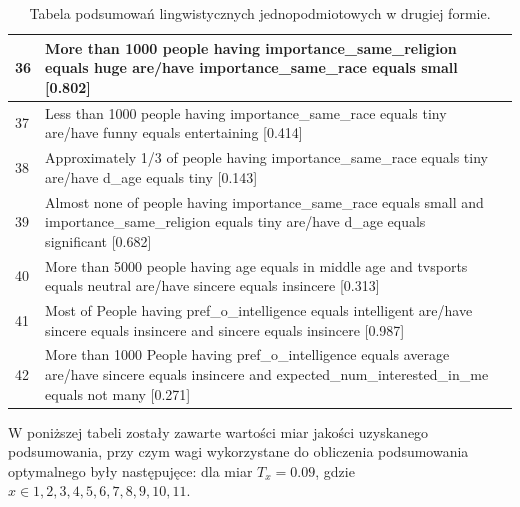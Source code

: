 \documentclass{classrep}
\begin{document}
\begin{center}
\begin{table}[H]
\begin{tabularx}{\textwidth}{lXc}
    36 & More than 1000 people having importance\_same\_religion equals huge are/have importance\_same\_race equals small [0.802]\\ \hline
    37 & Less than 1000 people having importance\_same\_race equals tiny are/have funny equals entertaining [0.414] \\ \hline
    38 & Approximately 1/3 of people having importance\_same\_race equals tiny are/have d\_age equals tiny [0.143] \\ \hline
    39 & Almost none of people having importance\_same\_race equals small and importance\_same\_religion equals tiny are/have d\_age equals significant [0.682] \\ \hline
    40 & More than 5000 people having age equals in middle age and tvsports equals neutral are/have sincere equals insincere [0.313] \\ \hline
    41 & Most of People having pref\_o\_intelligence equals intelligent are/have sincere equals insincere and sincere equals insincere [0.987]\\ \hline
    42 & More than 1000 People having pref\_o\_intelligence equals average are/have sincere equals insincere and expected\_num\_interested\_in\_me equals not many [0.271]\\ \hline
    
  \end{tabularx}
  \caption{Tabela podsumowań lingwistycznych jednopodmiotowych w drugiej formie.}
\end{table}
\end{center}

W poniższej tabeli zostały zawarte wartości miar jakości uzyskanego podsumowania, przy czym wagi wykorzystane do
obliczenia podsumowania optymalnego były następujęce: dla miar $T_{x} = 0.09$, gdzie $x \in {1,2,3,4,5,6,7,8,9,10,11}$.
\end{document}
